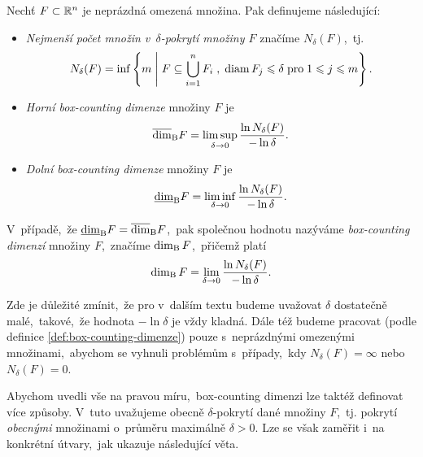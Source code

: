 \begin{definition}\label{def:box-counting-dimenze}
    Nechť $F\subset \mathbb{R}^n$ je neprázdná omezená množina. Pak definujeme následující:
    \begin{itemize}
        \item \emph{Nejmenší počet množin v~$\delta$-pokrytí množiny $F$} značíme $N_\delta(F)$,~tj.
        \[N_\delta(F)=\inf\left\{m\;\middle|\;F\subseteq\bigcup_{i=1}^n F_i\;,\;\operatorname{diam}{F_j}\leqslant\delta\;\text{pro}\;1\leqslant j\leqslant m\right\}.\]
        \item \emph{Horní box-counting dimenze} množiny $F$ je
        \[\overline{\dim}_\text{B}{F}=\limsup_{\delta\to 0}\dfrac{\ln{N_\delta(F)}}{-\ln{\delta}}.\]
        \item \emph{Dolní box-counting dimenze} množiny $F$ je
        \[\underline{\dim}_\text{B}{F}=\liminf_{\delta\to 0}\dfrac{\ln{N_\delta(F)}}{-\ln{\delta}}.\]
    \end{itemize}
    V~případě,~že $\underline{\dim}_\text{B}{F}=\overline{\dim}_\text{B}{F}$,~pak společnou hodnotu nazýváme \emph{box-counting dimenzí} množiny $F$,~značíme $\operatorname{dim_B}{F}$,~přičemž platí
    \[\operatorname{dim_B}{F}=\lim_{\delta\to 0}\dfrac{\ln{N_\delta(F)}}{-\ln{\delta}}.\]
\end{definition}
\begin{remark}
    Zde je důležité zmínit,~že pro v~dalším textu budeme uvažovat $\delta$ dostatečně malé,~takové,~že hodnota $-\ln{\delta}$ je vždy kladná. Dále též budeme pracovat (podle definice \ref{def:box-counting-dimenze}) pouze s~neprázdnými omezenými množinami,~abychom se vyhnuli problémům s~případy,~kdy $N_\delta(F)=\infty$ nebo $N_\delta(F)=0$.
\end{remark}
Abychom uvedli vše na pravou míru,~box-counting dimenzi lze taktéž definovat více způsoby. V~tuto uvažujeme obecně $\delta$-pokrytí dané množiny $F$,~tj. pokrytí \emph{obecnými} množinami o~průměru maximálně $\delta>0$. Lze se však zaměřit i~na konkrétní útvary,~jak ukazuje následující věta.
